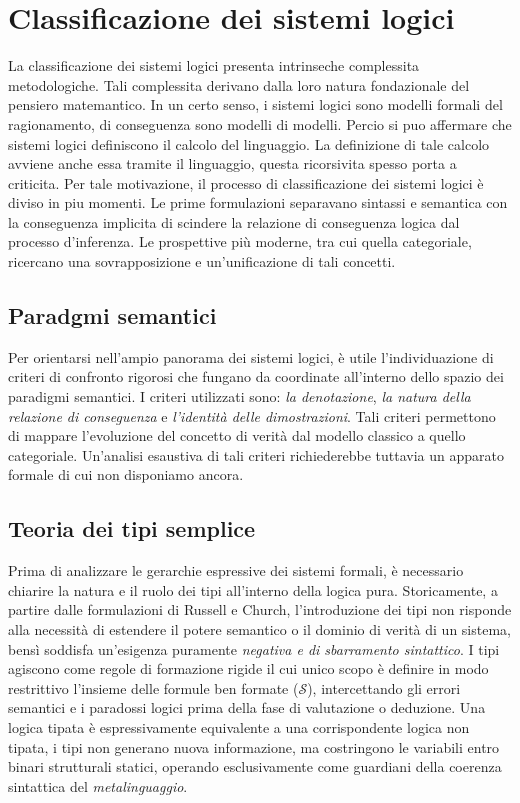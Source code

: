 \section{Classificazione dei sistemi logici}
La classificazione dei sistemi logici presenta intrinseche complessita metodologiche. Tali complessita derivano dalla loro natura fondazionale del pensiero matemantico. In un certo senso,
i sistemi logici sono modelli formali del ragionamento, di conseguenza sono modelli di modelli. Percio si puo affermare che sistemi logici definiscono il calcolo del linguaggio. La definizione
di tale calcolo avviene anche essa tramite il linguaggio, questa ricorsivita spesso porta a criticita. Per tale motivazione, il processo di classificazione dei sistemi logici è diviso in piu 
momenti. Le prime formulazioni separavano sintassi e semantica con la conseguenza implicita di scindere la relazione di conseguenza logica dal processo d'inferenza. Le prospettive più moderne, 
tra cui quella categoriale, ricercano una sovrapposizione e un'unificazione di tali concetti.

\subsection{Paradgmi semantici}
Per orientarsi nell'ampio panorama dei sistemi logici, è utile l'individuazione di criteri di confronto rigorosi che fungano da coordinate all'interno dello spazio dei paradigmi semantici.
I criteri utilizzati sono: \emph{la denotazione}, \emph{la natura della relazione di conseguenza} e \emph{l'identità delle dimostrazioni}. Tali criteri permettono di mappare l'evoluzione del 
concetto di verità dal modello classico a quello categoriale. Un'analisi esaustiva di tali criteri richiederebbe tuttavia un apparato formale di cui non disponiamo ancora. 

\subsection{Teoria dei tipi semplice}
Prima di analizzare le gerarchie espressive dei sistemi formali, è necessario chiarire la natura e il ruolo dei tipi all'interno della logica pura. Storicamente, a partire dalle formulazioni di 
Russell e Church, l'introduzione dei tipi non risponde alla necessità di estendere il potere semantico o il dominio di verità di un sistema, bensì soddisfa un'esigenza puramente \emph{negativa e 
di sbarramento sintattico}. I tipi agiscono come regole di formazione rigide il cui unico scopo è definire in modo restrittivo l'insieme delle formule ben formate ($\mathcal{S}$), intercettando gli 
errori semantici e i paradossi logici prima della fase di valutazione o deduzione. Una logica tipata è espressivamente equivalente a una corrispondente logica non tipata, i tipi non generano nuova 
informazione, ma costringono le variabili entro binari strutturali statici, operando esclusivamente come guardiani della coerenza sintattica del \emph{metalinguaggio}.


